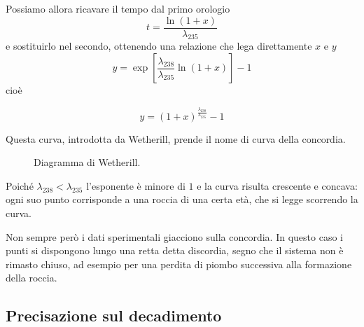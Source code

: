 Possiamo allora ricavare il tempo dal primo orologio
%
\begin{equation*}
    t = \frac{\ln(1 + x)}{\lambda_{235}}
\end{equation*}
e sostituirlo nel secondo, ottenendo una relazione che lega direttamente $x$ e $y$
%
\begin{equation*}
    y = \exp \left[ \frac{\lambda_{238}}{\lambda_{235}} \ln(1+x) \right] - 1
\end{equation*}
cioè
%
\begin{tcolorbox}[colback=black!5!white, colframe=black!45!white, boxrule=0.8pt]
\begin{equation}
    y = (1 + x)^{\frac{\lambda_{238}}{\lambda_{235}}} - 1
\end{equation}
\end{tcolorbox}
Questa curva, introdotta da Wetherill, prende il nome di curva della concordia. 

\begin{figure}[htbp]
\centering
{}
\caption{Diagramma di Wetherill.}
\label{fig:concordia}
\end{figure}
Poiché $\lambda_{238} < \lambda_{235}$ l'esponente è minore di $1$ e la curva risulta crescente e concava: ogni suo punto corrisponde a una roccia di una certa età, che si legge scorrendo la curva. 

Non sempre però i dati sperimentali giacciono sulla concordia. In questo caso i punti si dispongono lungo una retta detta discordia, segno che il sistema non è rimasto chiuso, ad esempio per una perdita di piombo successiva alla formazione della roccia. 

\subsection{Precisazione sul decadimento}

